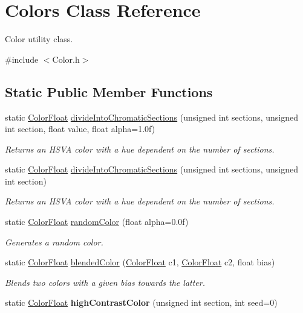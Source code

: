 \hypertarget{class_colors}{\section{Colors Class Reference}
\label{class_colors}
}


Color utility class.  




{\ttfamily \#include $<$Color.\+h$>$}

\subsection*{Static Public Member Functions}
\begin{DoxyCompactItemize}
\item 
static \hyperlink{struct_color_float}{Color\+Float} \hyperlink{class_colors_a9d471a8fb06c0aac407de2945c1c65c6}{divide\+Into\+Chromatic\+Sections} (unsigned int sections, unsigned int section, float value, float alpha=1.\+0f)
\begin{DoxyCompactList}\small\item\em Returns an H\+S\+V\+A color with a hue dependent on the number of sections. \end{DoxyCompactList}\item 
static \hyperlink{struct_color_float}{Color\+Float} \hyperlink{class_colors_ad8312b55a80fb26bb20a80e8af8d3f1a}{divide\+Into\+Chromatic\+Sections} (unsigned int sections, unsigned int section)
\begin{DoxyCompactList}\small\item\em Returns an H\+S\+V\+A color with a hue dependent on the number of sections. \end{DoxyCompactList}\item 
static \hyperlink{struct_color_float}{Color\+Float} \hyperlink{class_colors_a3155080f6bbee603212059a8f4abe6f3}{random\+Color} (float alpha=0.\+0f)
\begin{DoxyCompactList}\small\item\em Generates a random color. \end{DoxyCompactList}\item 
static \hyperlink{struct_color_float}{Color\+Float} \hyperlink{class_colors_ae24518e4d2618cc5a670316f6d53f844}{blended\+Color} (\hyperlink{struct_color_float}{Color\+Float} c1, \hyperlink{struct_color_float}{Color\+Float} c2, float bias)
\begin{DoxyCompactList}\small\item\em Blends two colors with a given bias towards the latter. \end{DoxyCompactList}\item 
\hypertarget{class_colors_ae43bb23e649eb2a5a9fd9e34f25092f7}{static \hyperlink{struct_color_float}{Color\+Float} {\bfseries high\+Contrast\+Color} (unsigned int section, int seed=0)}\label{class_colors_ae43bb23e649eb2a5a9fd9e34f25092f7}

\end{DoxyCompactItemize}


